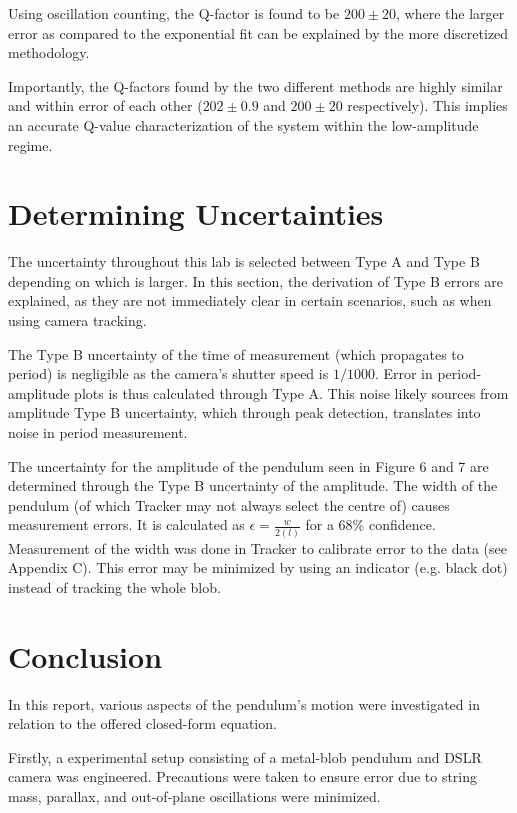 \documentclass[prl,twocolumn,amsmath,amssymb,superscriptaddress]{revtex4-2}
\begin{document}
Using oscillation counting, the Q-factor is found to be $200\pm20$, where the larger error as compared to the exponential fit can be explained by the more discretized methodology.

Importantly, the Q-factors found by the two different methods are highly similar and within error of each other ($202\pm0.9$ and $200\pm20$ respectively). This implies an accurate Q-value characterization of the system within the low-amplitude regime.

\vspace{64pt}
\section{Determining Uncertainties}

The uncertainty throughout this lab is selected between Type A and Type B depending on which is larger. In this section, the derivation of Type B errors are explained, as they are not immediately clear in certain scenarios, such as when using camera tracking.

The Type B uncertainty of the time of measurement (which propagates to period) is negligible as the camera's shutter speed is $1/1000$. Error in period-amplitude plots is thus calculated through Type A. This noise likely sources from amplitude Type B uncertainty, which through peak detection, translates into noise in period measurement.

The uncertainty for the amplitude of the pendulum seen in Figure 6 and 7 are determined through the Type B uncertainty of the amplitude. The width of the pendulum (of which Tracker may not always select the centre of) causes measurement errors. It is calculated as $\epsilon = \frac{w}{2(l)}$ for a 68\% confidence. Measurement of the width was done in Tracker to calibrate error to the data (see Appendix C). This error may be minimized by using an indicator (e.g. black dot) instead of tracking the whole blob.

\section{Conclusion}
In this report, various aspects of the pendulum's motion were investigated in relation to the offered closed-form equation.

Firstly, a experimental setup consisting of a metal-blob pendulum and DSLR camera was engineered. Precautions were taken to ensure error due to string mass, parallax, and out-of-plane oscillations were minimized.
\end{document}
